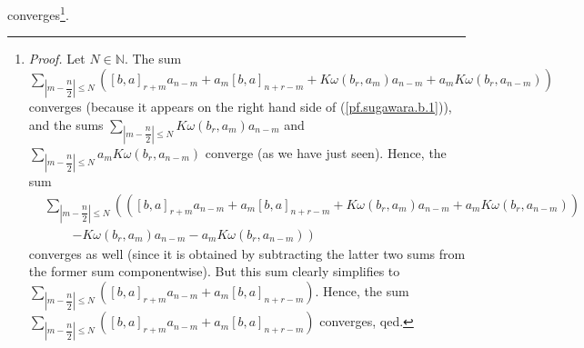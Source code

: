 \documentclass[etingof-lie.tex]{subfiles}
\begin{document}
converges\footnote{\textit{Proof.} Let $N\in\mathbb{N}$. The sum
$\sum\limits_{\left\vert m-\dfrac{n}{2}\right\vert \leq N}\left(  \left[
b,a\right]  _{r+m}a_{n-m}+a_{m}\left[  b,a\right]  _{n+r-m}+K\omega\left(
b_{r},a_{m}\right)  a_{n-m}+a_{m}K\omega\left(  b_{r},a_{n-m}\right)  \right)
$ converges (because it appears on the right hand side of
(\ref{pf.sugawara.b.1})), and the sums $\sum\limits_{\left\vert m-\dfrac{n}%
{2}\right\vert \leq N}K\omega\left(  b_{r},a_{m}\right)  a_{n-m}$ and
$\sum\limits_{\left\vert m-\dfrac{n}{2}\right\vert \leq N}a_{m}K\omega\left(
b_{r},a_{n-m}\right)  $ converge (as we have just seen). Hence, the sum%
\begin{align*}
&  \sum\limits_{\left\vert m-\dfrac{n}{2}\right\vert \leq N}\left(  \left(
\left[  b,a\right]  _{r+m}a_{n-m}+a_{m}\left[  b,a\right]  _{n+r-m}%
+K\omega\left(  b_{r},a_{m}\right)  a_{n-m}+a_{m}K\omega\left(  b_{r}%
,a_{n-m}\right)  \right)  \right. \\
&  \ \ \ \ \ \ \ \ \ \ \left.  -K\omega\left(  b_{r},a_{m}\right)
a_{n-m}-a_{m}K\omega\left(  b_{r},a_{n-m}\right)  \right)
\end{align*}
converges as well (since it is obtained by subtracting the latter two sums
from the former sum componentwise). But this sum clearly simplifies to
$\sum\limits_{\left\vert m-\dfrac{n}{2}\right\vert \leq N}\left(  \left[
b,a\right]  _{r+m}a_{n-m}+a_{m}\left[  b,a\right]  _{n+r-m}\right)  $. Hence,
the sum $\sum\limits_{\left\vert m-\dfrac{n}{2}\right\vert \leq N}\left(
\left[  b,a\right]  _{r+m}a_{n-m}+a_{m}\left[  b,a\right]  _{n+r-m}\right)  $
converges, qed.}.
\end{document}
